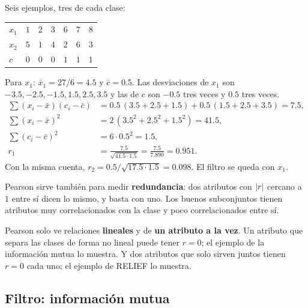 \documentclass[11pt,letterpaper]{article}
\begin{document}
\begin{ejemplo}
    Seis ejemplos, tres de cada clase:
    \begin{center}
    \small
    \begin{tabular}{lcccccc}
        \toprule
        $x_1$ & $1$ & $2$ & $3$ & $6$ & $7$ & $8$ \\
        $x_2$ & $5$ & $1$ & $4$ & $2$ & $6$ & $3$ \\
        $c$   & $0$ & $0$ & $0$ & $1$ & $1$ & $1$ \\
        \bottomrule
    \end{tabular}
    \end{center}
    Para $x_1$: $\bar{x}_1 = 27/6 = 4.5$ y $\bar{c} = 0.5$. Las
    desviaciones de $x_1$ son $-3.5, -2.5, -1.5, 1.5, 2.5, 3.5$ y las de
    $c$ son $-0.5$ tres veces y $0.5$ tres veces.
    \begin{align*}
        \textstyle\sum (x_i - \bar{x})(c_i - \bar{c})
            &= 0.5\,(3.5 + 2.5 + 1.5) + 0.5\,(1.5 + 2.5 + 3.5) = 7.5 , \\
        \textstyle\sum (x_i - \bar{x})^2
            &= 2\,(3.5^2 + 2.5^2 + 1.5^2) = 41.5 , \\
        \textstyle\sum (c_i - \bar{c})^2
            &= 6 \cdot 0.5^2 = 1.5 , \\
        r_1 &= \frac{7.5}{\sqrt{41.5 \cdot 1.5}}
             = \frac{7.5}{7.890} = 0.951 .
    \end{align*}
    Con la misma cuenta, $r_2 = 0.5 / \sqrt{17.5 \cdot 1.5} = 0.098$.
    El filtro se queda con $x_1$.
\end{ejemplo}

Pearson sirve también para medir \textbf{redundancia}: dos atributos
con $\left\lvert r \right\rvert$ cercano a $1$ entre sí dicen lo mismo, y basta con uno.
Los buenos subconjuntos tienen atributos muy correlacionados con la
clase y poco correlacionados entre sí.

\begin{ojo}
    Pearson solo ve relaciones \textbf{lineales} y de \textbf{un
    atributo a la vez}. Un atributo que separa las clases de forma no
    lineal puede tener $r = 0$; el ejemplo de la información mutua lo
    muestra. Y dos atributos que solo sirven juntos tienen $r = 0$ cada
    uno; el ejemplo de RELIEF lo muestra.
\end{ojo}


\subsection*{Filtro: información mutua}
\end{document}
